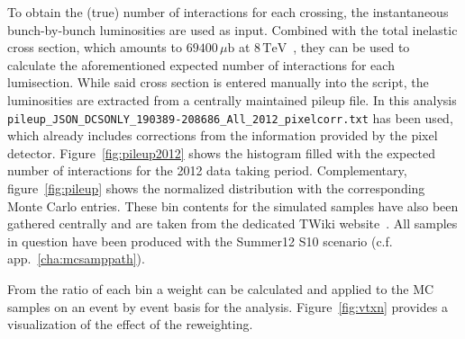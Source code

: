 To obtain the (true) number of interactions for each crossing, the instantaneous bunch-by-bunch luminosities are used as input. Combined with the total inelastic cross section, which amounts to $69400\,\mu\text{b}$ at $8\,\text{TeV}$~\cite{pileup}, they can be used to calculate the aforementioned expected number of interactions for each lumisection. While said cross section is entered manually into the script, the luminosities are extracted from a centrally maintained pileup file. In this analysis \verb+pileup_JSON_DCSONLY_190389-208686_All_2012_pixelcorr.txt+ has been used, which already includes corrections from the information provided by the pixel detector. Figure~\ref{fig:pileup2012} shows the histogram filled with the expected number of interactions for the 2012 data taking period. Complementary, figure~\ref{fig:pileup} shows the normalized distribution with the corresponding Monte Carlo entries. These bin contents for the simulated samples have also been gathered centrally and are taken from the dedicated TWiki website~\cite{pileupmc}. All samples in question have been produced with the Summer12 S10 scenario (c.f. app.~\ref{cha:mcsamppath}).

From the ratio of each bin a weight can be calculated and applied to the MC samples on an event by event basis for the analysis. Figure~\ref{fig:vtxn} provides a visualization of the effect of the reweighting.


